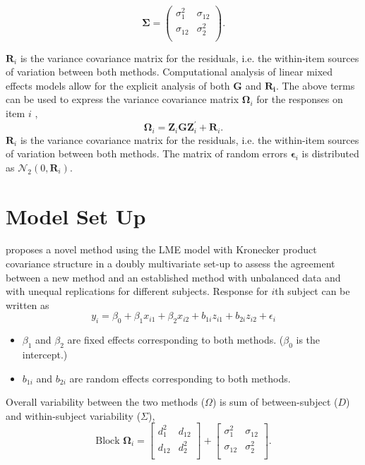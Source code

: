 \documentclass[12pt, a4paper]{report}
\theoremstyle{plain}
\theoremstyle{definition}
\theoremstyle{remark}
\begin{document}
\[
\boldsymbol{\Sigma} = \left( \begin{array}{cc}
\sigma^2_{1} & \sigma_{12} \\
\sigma_{12} & \sigma^2_{2} \\
\end{array}\right).
\]	



$\boldsymbol{R}_{i}$ is the variance covariance matrix for the residuals, i.e. the within-item sources of variation between both methods. Computational analysis of linear mixed effects models allow for the explicit analysis of both $\boldsymbol{G}$ and $\boldsymbol{R_i}$.
The above terms can be used to express the  variance covariance matrix $\boldsymbol{\Omega}_i$ for the responses on item $i$ ,
\[
\boldsymbol{\Omega}_i = \boldsymbol{Z}_i \boldsymbol{G} \boldsymbol{Z}_i^{\prime} + \boldsymbol{R}_i.
\]
$\boldsymbol{R}_{i}$ is the variance covariance matrix for the residuals, i.e. the within-item sources of variation between both methods.	
The matrix of random errors $\boldsymbol{\epsilon}_i$ is distributed as $\mathcal{N}_2(0,\boldsymbol{R}_i)$.


\section{Model Set Up}

\citet{ARoy2009} proposes a novel method using the LME model with Kronecker product covariance structure in a doubly multivariate set-up to assess the agreement between a new method and an established method with unbalanced data and with unequal replications for different subjects.
Response for $i$th subject can be written as
\[ y_i = \beta_0 + \beta_1x_{i1} + \beta_2x_{i2} + b_{1i}z_{i1}  + b_{2i}z_{i2} + \epsilon_i \]
\begin{itemize}
	\item $\beta_1$ and $\beta_2$ are fixed effects corresponding to both methods. ($\beta_0$ is the intercept.)
	\item $b_{1i}$ and $b_{2i}$ are random effects corresponding to both methods.
\end{itemize}

Overall variability between the two methods ($\Omega$) is sum of between-subject ($D$) and within-subject variability ($\Sigma$),
\[
\mbox{Block } \boldsymbol{\Omega}_i = \left[ \begin{array}{cc} d^2_1 & d_{12}\\ d_{12} & d^2_2\\ \end{array} \right]
+ \left[\begin{array}{cc} \sigma^2_1 & \sigma_{12}\\ \sigma_{12} & \sigma^2_2\\ \end{array}\right].
\]
\bigskip
\end{document}
